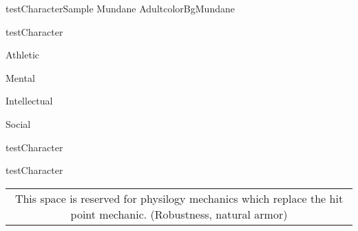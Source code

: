 \begin{actorCardLetterSizeFitToPage}{testCharacter}{Sample Mundane Adult}{colorBgMundane}

	\begin{capabilitiesBox}{testCharacter}
		\begin{capabilitiesTable}{Athletic}
		\end{capabilitiesTable}
		\begin{capabilitiesTable}{Mental}
		\end{capabilitiesTable}
		\begin{capabilitiesTable}{Intellectual}
		\end{capabilitiesTable}
		\begin{capabilitiesTable}{Social}
	   \end{capabilitiesTable}
	\end{capabilitiesBox}

	\begin{expertiseBox}{testCharacter}
	\end{expertiseBox}


	\begin{physiologyBox}{testCharacter}
		\begin{tabular}[t]{c}
			This space is reserved for physilogy mechanics which replace the hit point
			mechanic. (Robustness, natural armor)
		\end{tabular}
	\end{physiologyBox}

\end{actorCardLetterSizeFitToPage}

